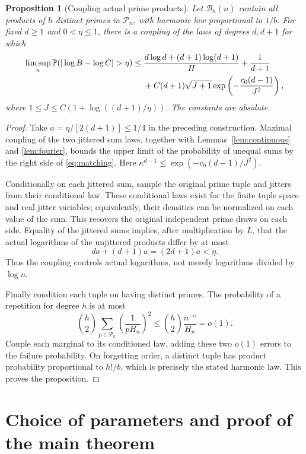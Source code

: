 \documentclass[11pt]{article}
\newtheorem{proposition}[theorem]{Proposition}
\theoremstyle{remark}\newtheorem{remark}[theorem]{Remark}
\newcommand{\Prob}{\mathbb P}
\begin{document}
\begin{proposition}[Coupling actual prime products]\label{prop:matching}
Let $\mathcal B_h(n)$ contain all products of $h$ distinct primes in $\mathcal P_n$, with harmonic law proportional to $1/b$. For fixed $d\ge1$ and $0<\eta\le1$, there is a coupling of the laws of degrees $d,d+1$ for which
\begin{align}\label{eq:matching}
 \limsup_n\Prob(|\log B-\log C|>\eta)
 \le{}&\frac{d\log d+(d+1)\log(d+1)}H+\frac1{d+1}\notag\\
 &+C(d+1)\sqrt{J+1}\exp\left(-\frac{c_0(d-1)}{J^2}\right),
\end{align}
where $1\le J\le C(1+\log((d+1)/\eta))$. The constants are absolute.
\end{proposition}
\begin{proof}
Take $a=\eta/[2(d+1)]\le1/4$ in the preceding construction. Maximal coupling of the two jittered sum laws, together with Lemmas~\ref{lem:continuous} and \ref{lem:fourier}, bounds the upper limit of the probability of unequal sums by the right side of \eqref{eq:matching}. Here $\kappa^{d-1}\le\exp(-c_0(d-1)/J^2)$.

Conditionally on each jittered sum, sample the original prime tuple and jitters from their conditional law. These conditional laws exist for the finite tuple space and real jitter variables; equivalently, their densities can be normalized on each value of the sum. This recovers the original independent prime draws on each side. Equality of the jittered sums implies, after multiplication by $L$, that the actual logarithms of the unjittered products differ by at most
\[
 da+(d+1)a=(2d+1)a<\eta.
\]
Thus the coupling controls actual logarithms, not merely logarithms divided by $\log n$.

Finally condition each tuple on having distinct primes. The probability of a repetition for degree $h$ is at most
\[
 \binom h2\sum_{p\in\mathcal P_n}\left(\frac1{pH_n}\right)^2
 \le\binom h2\frac{n^{-c}}{H_n}=o(1).
\]
Couple each marginal to its conditioned law, adding these two $o(1)$ errors to the failure probability. On forgetting order, a distinct tuple has product probability proportional to $h!/b$, which is precisely the stated harmonic law. This proves the proposition.
\end{proof}

\section{Choice of parameters and proof of the main theorem}
\end{document}

